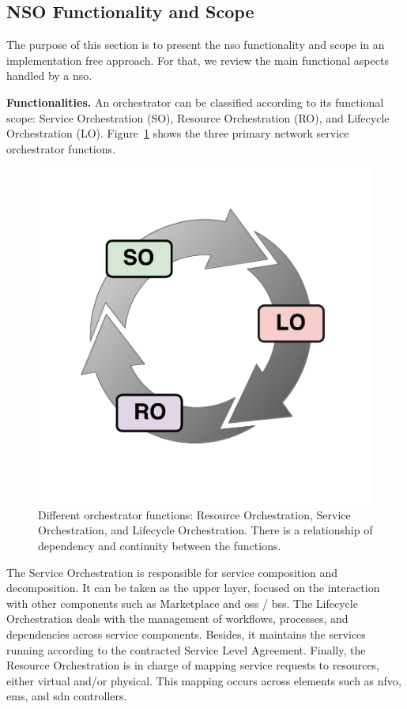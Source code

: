\subsection{NSO Functionality and Scope}
\label{sec:def}

The purpose of this section is to present the \gls{nso} functionality and scope in an implementation free approach. For that, we review the main functional aspects handled by a \gls{nso}.

\textbf{Functionalities.} An orchestrator can be classified according to its functional scope: Service Orchestration (SO), Resource Orchestration (RO), and Lifecycle Orchestration (LO). Figure~\ref{funOrch} shows the three primary network service orchestrator functions.

\begin{figure}[t!]
  \centering
  \includegraphics[scale=.45]{Figures/04_NSO/fig9.pdf}
    \caption{Different orchestrator functions: Resource Orchestration, Service Orchestration, and Lifecycle Orchestration. There is a relationship of dependency and continuity between the functions.}
    \label{funOrch}
\end{figure}

The Service Orchestration is responsible for service composition and decomposition. It can be taken as the upper layer, focused on the interaction with other components such as Marketplace and \gls{oss} / \gls{bss}. The Lifecycle Orchestration deals with the management of workflows, processes, and dependencies across service components. Besides, it maintains the services running according to the contracted Service Level Agreement. Finally, the Resource Orchestration is in charge of mapping service requests to resources, either virtual and/or physical. This mapping occurs across elements such as \gls{nfvo}, \gls{ems}, and \gls{sdn} controllers.


